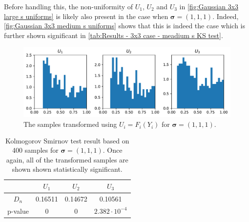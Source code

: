\documentclass[../Thesis.tex]{subfiles}
\begin{document}




Before handling this, the non-uniformity of $U_1$, $U_2$ and $U_3$ in \autoref{fig:Gaussian 3x3 large s uniforms} is likely also present in the case when $\boldsymbol\sigma = (1,1,1)$. Indeed, \autoref{fig:Gaussian 3x3 medium s uniforms} shows that this is indeed the case which is further shown significant in \autoref{tab:Results - 3x3 case - meadium s KS test}.
\begin{figure}[H]
    \centering
    \includegraphics[width=0.99\linewidth]{figures/ND examples/Gaussian 3x3 medium s uniforms.pdf}
    \caption{The samples transformed using $U_i = F_i(Y_i)$ for $\boldsymbol\sigma = (1,1,1)$.}
    \label{fig:Gaussian 3x3 medium s uniforms}
\end{figure}
\begin{table}[ht]
    \centering
    \begin{tabular}{c|c|c|c}
                & $U_1$   & $U_2$   & $U_3$                 \\\hline
        $D_n$   & 0.16511 & 0.14672 & 0.10561               \\
        p-value & 0       & 0       & $2.382 \cdot 10^{-4}$
    \end{tabular}
    \caption{Kolmogorov Smirnov test result based on 400 samples for $\boldsymbol\sigma = (1, 1, 1)$. Once again, all of the transformed samples are shown shown statistically significant.}
    \label{tab:Results - 3x3 case - meadium s KS test}
\end{table}


\end{document}
